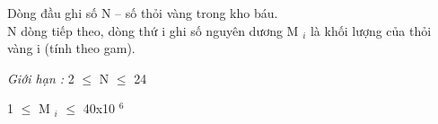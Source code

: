Dòng đầu ghi số N – số thỏi vàng trong kho báu.
\\N dòng tiếp theo, dòng thứ i ghi số nguyên dương M $_ i $ là khối lượng của thỏi vàng i (tính theo gam).

\emph{Giới hạn : } 2  $\le$  N  $\le$  24

1  $\le$  M $_ i $  $\le$  40x10 $^ 6 $